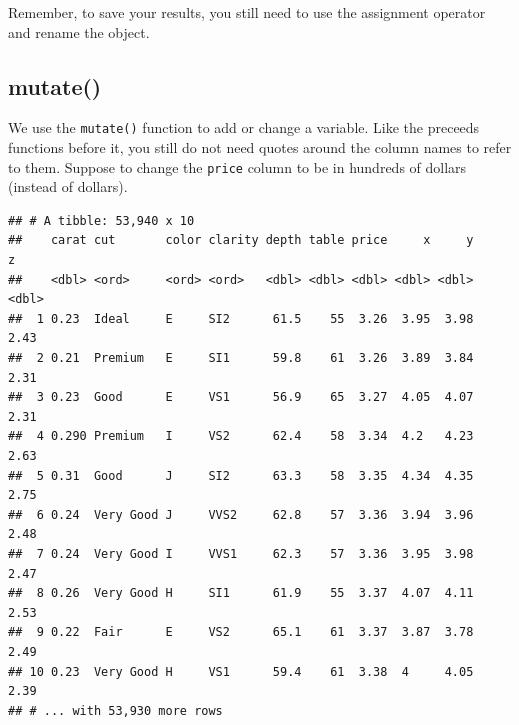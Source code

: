 \documentclass[
]{book}
\newenvironment{Shaded}{\begin{snugshade}}{\end{snugshade}}
\newcommand{\DataTypeTok}[1]{\textcolor[rgb]{0.13,0.29,0.53}{#1}}
\newcommand{\DecValTok}[1]{\textcolor[rgb]{0.00,0.00,0.81}{#1}}
\newcommand{\KeywordTok}[1]{\textcolor[rgb]{0.13,0.29,0.53}{\textbf{#1}}}
\newcommand{\NormalTok}[1]{#1}
\newcommand{\OperatorTok}[1]{\textcolor[rgb]{0.81,0.36,0.00}{\textbf{#1}}}
\newcommand{\StringTok}[1]{\textcolor[rgb]{0.31,0.60,0.02}{#1}}
\begin{document}
Remember, to save your results, you still need to use the assignment operator and rename the object.

\begin{Shaded}
\end{Shaded}

\hypertarget{mutate}{%
\subsection{mutate()}\label{mutate}}

We use the \texttt{mutate()} function to add or change a variable. Like the preceeds functions before it, you still do not need quotes around the column names to refer to them. Suppose to change the \texttt{price} column to be in hundreds of dollars (instead of dollars).

\begin{Shaded}
\end{Shaded}

\begin{verbatim}
## # A tibble: 53,940 x 10
##    carat cut       color clarity depth table price     x     y     z
##    <dbl> <ord>     <ord> <ord>   <dbl> <dbl> <dbl> <dbl> <dbl> <dbl>
##  1 0.23  Ideal     E     SI2      61.5    55  3.26  3.95  3.98  2.43
##  2 0.21  Premium   E     SI1      59.8    61  3.26  3.89  3.84  2.31
##  3 0.23  Good      E     VS1      56.9    65  3.27  4.05  4.07  2.31
##  4 0.290 Premium   I     VS2      62.4    58  3.34  4.2   4.23  2.63
##  5 0.31  Good      J     SI2      63.3    58  3.35  4.34  4.35  2.75
##  6 0.24  Very Good J     VVS2     62.8    57  3.36  3.94  3.96  2.48
##  7 0.24  Very Good I     VVS1     62.3    57  3.36  3.95  3.98  2.47
##  8 0.26  Very Good H     SI1      61.9    55  3.37  4.07  4.11  2.53
##  9 0.22  Fair      E     VS2      65.1    61  3.37  3.87  3.78  2.49
## 10 0.23  Very Good H     VS1      59.4    61  3.38  4     4.05  2.39
## # ... with 53,930 more rows
\end{verbatim}
\end{document}
